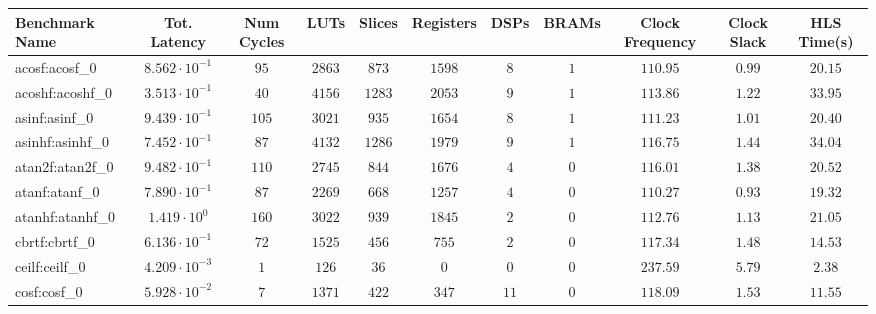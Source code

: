 \begin{tabular}{|l|c|c|c|c|c|c|c|c|c|c|}
\hline
Benchmark Name               & Tot. Latency            & Num Cycles & LUTs      & Slices    & Registers & DSPs    & BRAMs & Clock Frequency & Clock Slack & HLS Time(s) \\
\hline
acosf:acosf\_0               & $ 8.562 \cdot 10^{-1} $ & $ 95     $ & $ 2863  $ & $ 873   $ & $ 1598  $ & $ 8   $ & $ 1 $ & $ 110.95      $ & $ 0.99    $ & $ 20.15   $ \\
acoshf:acoshf\_0             & $ 3.513 \cdot 10^{-1} $ & $ 40     $ & $ 4156  $ & $ 1283  $ & $ 2053  $ & $ 9   $ & $ 1 $ & $ 113.86      $ & $ 1.22    $ & $ 33.95   $ \\
asinf:asinf\_0               & $ 9.439 \cdot 10^{-1} $ & $ 105    $ & $ 3021  $ & $ 935   $ & $ 1654  $ & $ 8   $ & $ 1 $ & $ 111.23      $ & $ 1.01    $ & $ 20.40   $ \\
asinhf:asinhf\_0             & $ 7.452 \cdot 10^{-1} $ & $ 87     $ & $ 4132  $ & $ 1286  $ & $ 1979  $ & $ 9   $ & $ 1 $ & $ 116.75      $ & $ 1.44    $ & $ 34.04   $ \\
atan2f:atan2f\_0             & $ 9.482 \cdot 10^{-1} $ & $ 110    $ & $ 2745  $ & $ 844   $ & $ 1676  $ & $ 4   $ & $ 0 $ & $ 116.01      $ & $ 1.38    $ & $ 20.52   $ \\
atanf:atanf\_0               & $ 7.890 \cdot 10^{-1} $ & $ 87     $ & $ 2269  $ & $ 668   $ & $ 1257  $ & $ 4   $ & $ 0 $ & $ 110.27      $ & $ 0.93    $ & $ 19.32   $ \\
atanhf:atanhf\_0             & $ 1.419 \cdot 10^{0}  $ & $ 160    $ & $ 3022  $ & $ 939   $ & $ 1845  $ & $ 2   $ & $ 0 $ & $ 112.76      $ & $ 1.13    $ & $ 21.05   $ \\
cbrtf:cbrtf\_0               & $ 6.136 \cdot 10^{-1} $ & $ 72     $ & $ 1525  $ & $ 456   $ & $ 755   $ & $ 2   $ & $ 0 $ & $ 117.34      $ & $ 1.48    $ & $ 14.53   $ \\
ceilf:ceilf\_0               & $ 4.209 \cdot 10^{-3} $ & $ 1      $ & $ 126   $ & $ 36    $ & $ 0     $ & $ 0   $ & $ 0 $ & $ 237.59      $ & $ 5.79    $ & $ 2.38    $ \\
cosf:cosf\_0                 & $ 5.928 \cdot 10^{-2} $ & $ 7      $ & $ 1371  $ & $ 422   $ & $ 347   $ & $ 11  $ & $ 0 $ & $ 118.09      $ & $ 1.53    $ & $ 11.55   $ \\

\end{tabular}
